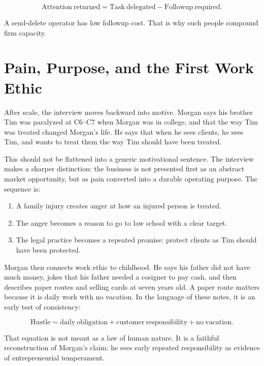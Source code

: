 \begin{equation}
\mathrm{Attention\ returned} =
\mathrm{Task\ delegated}
-
\mathrm{Followup\ required}.
\end{equation}

A send-delete operator has low followup cost. That is why such people compound firm capacity.

\section{Pain, Purpose, and the First Work Ethic}

After scale, the interview moves backward into motive. Morgan says his brother Tim was paralyzed at C6--C7 when Morgan was in college, and that the way Tim was treated changed Morgan's life. He says that when he sees clients, he sees Tim, and wants to treat them the way Tim should have been treated.

This should not be flattened into a generic motivational sentence. The interview makes a sharper distinction: the business is not presented first as an abstract market opportunity, but as pain converted into a durable operating purpose. The sequence is:

\begin{enumerate}
\item A family injury creates anger at how an injured person is treated.
\item The anger becomes a reason to go to law school with a clear target.
\item The legal practice becomes a repeated promise: protect clients as Tim should have been protected.
\end{enumerate}

Morgan then connects work ethic to childhood. He says his father did not have much money, jokes that his father needed a cosigner to pay cash, and then describes paper routes and selling cards at seven years old. A paper route matters because it is daily work with no vacation. In the language of these notes, it is an early test of consistency:

\begin{equation}
\mathrm{Hustle} \sim \mathrm{daily\ obligation} + \mathrm{customer\ responsibility} + \mathrm{no\ vacation}.
\end{equation}

That equation is not meant as a law of human nature. It is a faithful reconstruction of Morgan's claim: he sees early repeated responsibility as evidence of entrepreneurial temperament.

